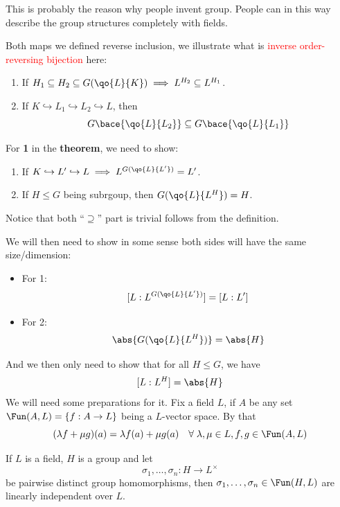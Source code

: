 \begin{note}
	This is probably the reason why people invent group. People can in this way describe the group
	structures completely with fields.
\end{note}

\begin{remark}
	Both maps we defined reverse inclusion, we illustrate what is \textcolor{red}{inverse
		order-reversing bijection} here:
	\begin{enumerate}
		\item If \( H_1 \subseteq H_2 \subseteq G(\qo{L}{K}) \implies L^{H_2} \subseteq L^{H_1} \).
		\item If \( K \hookrightarrow L_1 \hookrightarrow L_2 \hookrightarrow L \), then
		      \[
			      G\bace{\qo{L}{L_2}} \subseteq G\bace{\qo{L}{L_1}}
		      \]
	\end{enumerate}
\end{remark}

\begin{remark}
	For \textbf{1} in the \textbf{theorem}, we need to show:
	\begin{enumerate}
		\item If \( K \hookrightarrow L' \hookrightarrow L \implies L^{G(\qo{L}{L'})} = L' \).
		\item If \( H \leq G \) being subrgoup, then \( G(\qo{L}{L^H}) = H \).
	\end{enumerate}
\end{remark}

\begin{note}
	Notice that both ``\( \supseteq \)'' part is trivial follows from the definition.
\end{note}
We will then need to show in some sense both sides will have the same size/dimension:
\begin{itemize}
	\item For 1:
	      \[
		      [L : L^{G(\qo{L}{L'})}] = [L: L']
	      \]
	\item For 2:
	      \[
		      \abs{G(\qo{L}{L^H})} = \abs{H}
	      \]
\end{itemize}
And we then only need to show that for all \( H \leq G \), we have
\[
	[L:L^H] = \abs{H}
\]
We will need some preparations for it. Fix a field \( L \), if \( A \) be any set \( \Fun(A,L) = \{f: A \to L\} \)
being a \( L \)-vector space. By that
\[
	(\lambda f + \mu g) (a) = \lambda f(a) + \mu g(a) \quad \forall \; \lambda ,\mu \in L, f,g \in
	\Fun(A,L)
\]
\begin{theorem}
	If \( L \) is a field, \( H \) is a group and let
	\[
		\sigma _1,\ldots,\sigma _n : H \to L^\times
	\]
	be pairwise distinct group homomorphisms, then \( \sigma_1,\ldots, \sigma_n \in \Fun(H,L) \) are
	linearly independent over \( L \).
\end{theorem}

